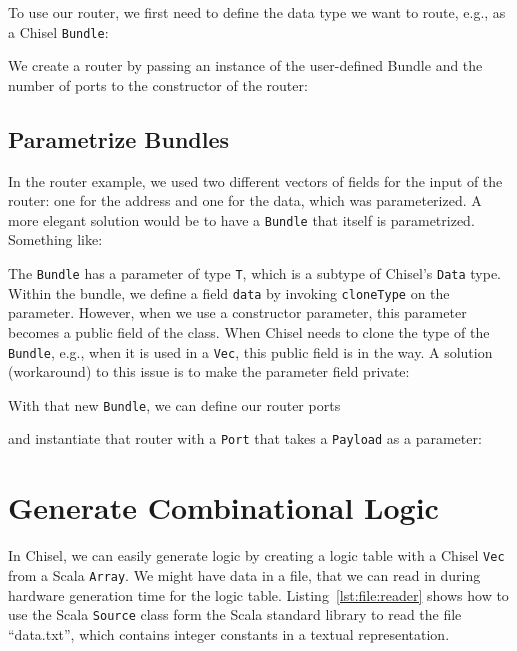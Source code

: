 \documentclass[%
    10pt,
    headinclude, footexclude,
    openright, %
    notitlepage,
    cleardoubleempty,
    headsepline,
    pointlessnumbers,
    bibtotoc, idxtotoc,
    ]{scrbook}
\newcommand{\code}[1]{{\small{\texttt{#1}}}}
\begin{document}

\noindent To use our router, we first need to define the data type we want to route, e.g.,
as a Chisel \code{Bundle}:


\noindent We create a router by passing an instance of the user-defined Bundle and
the number of ports to the constructor of the router:


\subsection{Parametrize Bundles}

In the router example, we used two different vectors of fields for the input
of the router: one for the address and one for the data, which was parameterized.
A more elegant solution would be to have a \code{Bundle} that itself
is parametrized. Something like:


The \code{Bundle} has a parameter of type \code{T}, which is a subtype
of Chisel's \code{Data} type.
Within the bundle, we define a field \code{data} by invoking \code{cloneType}
on the parameter.
However, when we use a constructor parameter, this parameter becomes a
public field of the class. When Chisel needs to clone the type of the \code{Bundle},
e.g., when it is used in a \code{Vec}, this public field is in the way.
A solution (workaround) to this issue is to make the parameter field private:


\noindent With that new \code{Bundle}, we can define our router ports


\noindent and instantiate that router with a \code{Port} that takes
a \code{Payload} as a parameter:



\section{Generate Combinational Logic}

In Chisel, we can easily generate logic by creating a logic table with
a Chisel \code{Vec} from a Scala \code{Array}.
We might have data in a file, that we can read in during hardware generation
time for the logic table.
Listing~\ref{lst:file:reader} shows how to use the Scala \code{Source}
class form the Scala standard library to read the file ``data.txt'', which
contains integer constants in a textual representation.
\end{document}
